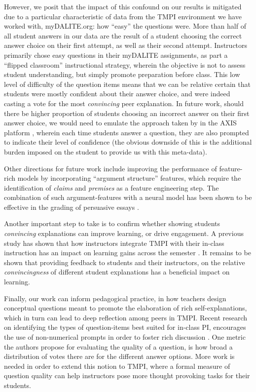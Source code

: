 \documentclass[notitlepage,12pt]{jedm}
\begin{document}
However, we posit that the impact of this confound on our results is mitigated 
due to a particular characteristic of data from the TMPI environment we have 
worked with, myDALITE.org:  how ``easy'' the questions were. 
More than half of all student answers in our data are the result of a student 
choosing the correct answer choice on their first attempt, as well as their 
second attempt.
Instructors primarily chose easy questions in their myDALITE
assignments, as part a ``flipped classroom'' instructional strategy, wherein 
the objective is not to assess student understanding, but simply promote 
preparation before class.
This low level of difficulty of the question items means that we can be 
relative certain that students were mostly confident about their answer choice, 
and were indeed casting a vote for the most \textit{convincing} peer 
explanation.
In future work, should there be higher proportion of students choosing an 
incorrect answer on their first answer choice, we would need to emulate the 
approach taken by in the AXIS platform \cite{williams_axis:_2016}, wherein each 
time students answer a question, they are also prompted to indicate their level 
of confidence (the obvious downside of this is the additional burden imposed on 
the student to provide us with this meta-data).

Other directions for future work include improving the performance of 
feature-rich models by incorporating ``argument structure'' features, which 
require the identification of \textit{claims} and \textit{premises} as a 
feature engineering step.
The combination of such argument-features with a neural model has been shown to 
be effective in the grading of persuasive essays \cite{nguyen_argument_2018}.

Another important step to take is to confirm whether showing students 
\textit{convincing} explanations can improve learning, or drive engagement. 
A previous study has shown that how instructors integrate TMPI with their 
in-class instruction has an impact on learning gains across the semester 
\cite{bhatnagar_analysis_2015}. 
It remains to be shown that providing feedback to students and their 
instructors, on the relative \textit{convincingness} of different student 
explanations has a beneficial impact on learning.

Finally, our work can inform pedagogical practice, in how teachers design 
conceptual questions meant to promote the elaboration of rich 
self-explanations, which in turn can lead to deep reflection among peers in 
TMPI.
Recent research on identifying the types of question-items best suited for 
in-class PI, encourages the use of non-numerical prompts in order to foster 
rich discussion \cite{cline_identifying_2021}. 
One metric the authors propose for evaluating the quality of a question, is how 
broad a distribution of votes there are for the different answer options.
More work is needed in order to extend this notion to TMPI, where a formal 
measure of question quality can help instructors pose more thought provoking 
tasks for their students.
 
\end{document}
